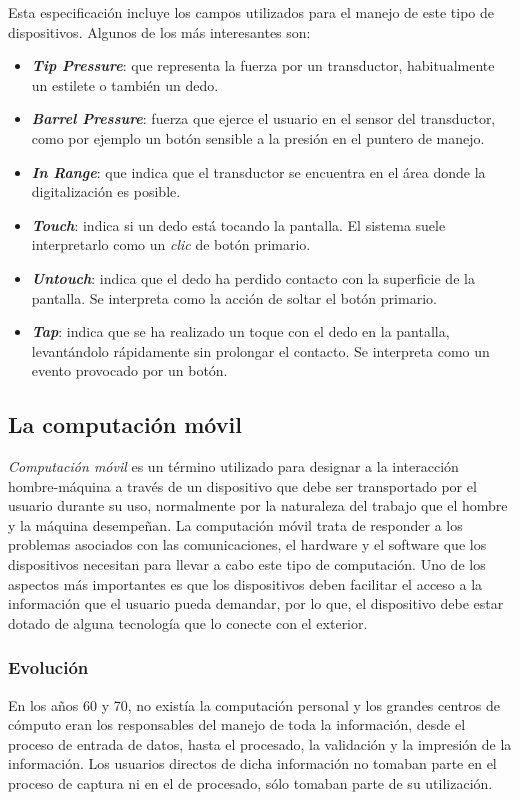 Esta especificación incluye los campos utilizados para el manejo de este tipo 
de dispositivos. Algunos de los más interesantes son:
\begin{itemize}
\item \textbf{\emph{Tip Pressure}}: que representa la fuerza por un 
transductor, habitualmente un estilete o también un dedo.
\item \textbf{\emph{Barrel Pressure}}: fuerza que ejerce el usuario en el 
sensor del transductor, como por ejemplo un botón sensible a la presión en el 
puntero de manejo.
\item \textbf{\emph{In Range}}: que indica que el transductor se encuentra en 
el área donde la digitalización es posible.
\item \textbf{\emph{Touch}}: indica si un dedo está tocando la pantalla. El 
sistema suele interpretarlo como un \emph{clic} de botón primario.
\item \textbf{\emph{Untouch}}: indica que el dedo ha perdido contacto con la 
superficie de la pantalla. Se interpreta como la acción de soltar el botón 
primario.
\item \textbf{\emph{Tap}}: indica que se ha realizado un toque con el dedo en 
la pantalla, levantándolo rápidamente sin prolongar el contacto. Se interpreta 
como un evento provocado por un botón.
\end{itemize}

\subsection{La computación móvil}
\emph{Computación móvil} es un término utilizado para designar a la interacción
hombre-máquina a través de un dispositivo que debe ser transportado por el
usuario durante su uso, normalmente por la naturaleza del trabajo que el hombre
y la máquina desempeñan. La computación móvil trata de responder a los 
problemas asociados con las comunicaciones, el hardware y el software que
los dispositivos necesitan para llevar a cabo este tipo de computación.
Uno de los aspectos más importantes es que los dispositivos deben facilitar el
acceso a la información que el usuario pueda demandar, por lo que, el
dispositivo debe estar dotado de alguna tecnología que lo conecte con el
exterior.

  \subsubsection{Evolución}
En los años 60 y 70, no existía la computación personal y los grandes centros
de cómputo eran los responsables del manejo de toda la información, desde
el proceso de entrada de datos, hasta el procesado, la validación y la
impresión de la información. Los usuarios directos de dicha información no
tomaban parte en el proceso de captura ni en el de procesado, sólo tomaban
parte de su utilización.

